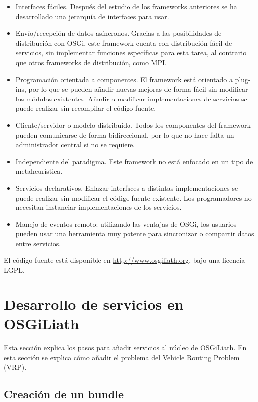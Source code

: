 \documentclass[runningheads]{llncs}
\begin{document}
\begin{itemize}
\item Interfaces fáciles. Después del estudio de los frameworks anteriores se ha desarrollado una jerarquía de interfaces para usar. 
\item Envío/recepción de datos asíncronos. Gracias a las posibilidades de distribución con OSGi, este framework cuenta con distribución fácil de servicios, sin implementar funciones específicas para esta tarea, al contrario que otros frameworks de distribución, como MPI.
\item Programación orientada a componentes. El framework está orientado a plug-ins, por lo que se pueden añadir nuevas mejoras de forma fácil sin modificar los módulos existentes. Añadir o modificar implementaciones de servicios se puede realizar sin recompilar el código fuente.
\item Cliente/servidor o modelo distribuido. Todos los componentes del framework pueden comunicarse de forma bidireccional, por lo que no hace falta un administrador central si no se requiere.
\item Independiente del paradigma. Este framework no está enfocado en un tipo de metaheurística.
\item Servicios declarativos. Enlazar interfaces a distintas implementaciones se puede realizar sin modificar el código fuente existente. Los programadores no necesitan instanciar implementaciones de los servicios.
\item Manejo de eventos remoto: utilizando las ventajas de OSGi, los usuarios pueden usar una herramienta muy potente para sincronizar o compartir datos entre servicios.
\end{itemize}

El código fuente está disponible en \url{http://www.osgiliath.org}, bajo una licencia LGPL.

\section{Desarrollo de servicios en OSGiLiath}
\label{sec:development}

Esta sección explica los pasos para añadir servicios al núcleo de OSGiLiath. En esta sección se explica cómo añadir el problema del Vehicle Routing Problem (VRP).

\subsection{Creación de un bundle}
\end{document}
